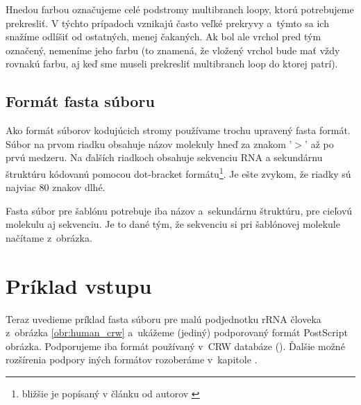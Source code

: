 Hnedou farbou označujeme celé podstromy multibranch loopy, ktorú potrebujeme
prekresliť. V týchto prípadoch vznikajú často veľké prekryvy a~týmto
sa ich snažíme odlíšiť od ostatných, menej čakaných.
Ak bol ale vrchol pred tým označený, nemeníme jeho farbu (to znamená, že vložený vrchol
bude mať vždy rovnakú farbu, aj keď sme museli prekresliť multibranch loop do ktorej patrí).





\subsection{Formát fasta súboru}

Ako formát súborov kodujúcich stromy používame trochu upravený fasta formát.
Súbor na prvom riadku obsahuje názov molekuly hneď za znakom '$>$' až po prvú medzeru.
Na ďalších riadkoch obsahuje sekvenciu RNA a sekundárnu štruktúru kódovanú
pomocou dot-bracket formátu\footnote{bližšie je popísaný v článku od autorov \citet{DRAWING_COMPARISION}}.
Je ešte zvykom, že riadky sú najviac 80 znakov dlhé.

Fasta súbor pre šablónu potrebuje iba názov a~sekundárnu štruktúru,
pre cieľovú molekulu aj sekvenciu. Je to dané tým, že sekvenciu
si pri šablónovej molekule načítame z~obrázka.



\section{Príklad vstupu}

Teraz uvedieme príklad fasta súboru pre malú podjednotku rRNA človeka z~obrázka
\ref{obr:human_crw} a~ukážeme (jediný) podporovaný formát PostScript obrázka.
Podporujeme iba formát používaný v~CRW databáze (\citet{CRW}).
Ďalšie možné rozšírenia podpory iných formátov rozoberáme v~kapitole
.

